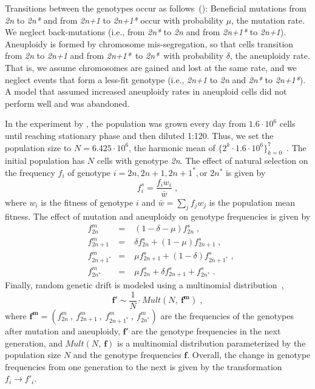 \documentclass[12pt]{extarticle}
\let\vec\mathbf
\newcommand{\euwt}{\emph{2n}}
\newcommand{\anwt}{\emph{2n+1}}
\newcommand{\eumt}{\emph{2n*}}
\newcommand{\anmt}{\emph{2n+1*}}
\begin{document}
Transitions between the genotypes occur as follows~(): Beneficial mutations from \euwt\; to \eumt\; and from \anwt\; to \anmt\; occur with probability $\mu$, the mutation rate. We neglect back-mutations (i.e., from \eumt\; to \euwt\; and from \anmt\; to \anwt).
Aneuploidy is formed by chromosome mis-segregation, so that cells transition from \euwt\; to \anwt\; and from \anmt\ to \eumt\ with probability $\delta$, the aneuploidy rate. That is, we assume chromosomes are gained and lost at the same rate, and we neglect events that form a less-fit genotype (i.e., \anwt\; to \euwt\; and \eumt\; to \anmt). A model that assumed increased aneuploidy rates in aneuploid cells did not perform well and was abandoned.

In the experiment by \citet{Yona2012}, the population was grown every day from $1.6 \cdot 10^6$ cells until reaching stationary phase and then diluted 1:120.
Thus, we set the population size to $N=6.425 \cdot 10^6$, the harmonic mean of $\{2^k \cdot 1.6 \cdot 10^6\}_{k=0}^{7}$~\citep{Crow1970}.
The initial population has $N$ cells with genotype \euwt. 
The effect of natural selection on the frequency $f_i$ of genotype $i = 2n, 2n+1, 2n+1^*, \text{or } 2n^*$ is given by
    \begin{equation} \label{eq:selection-single} 
      f^s_i = \frac{f_i w_i}{\bar{w}} \;,
    \end{equation}
where $w_i$ is the fitness of genotype $i$ and $\bar{w} = \sum_{j}{f_j w_j}$ is the population mean fitness.
The effect of mutation and aneuploidy on genotype frequencies is given by
    \begin{equation} \label{eq:mutation-aneuploidy-single}
    \begin{aligned}
      &f^m_{2n} &=&\; (1 - \delta - \mu) f^s_{2n}  \;,\\
      &f^m_{2n+1} &=&\; \delta f^s_{2n} + (1 - \mu) f^s_{2n+1}  \;,\\
      &f^m_{2n+1^*} &=&\; \mu f^s_{2n+1} + (1-\delta) f^s_{2n+1^*}  \;,\\
      &f^m_{2n^*} &=&\; \mu f^s_{2n} + \delta f^s_{2n+1} + f^s_{2n^*}  \;.
    \end{aligned}
    \end{equation}
Finally, random genetic drift is modeled using a multinomial distribution~\citep{Otto2007},
    \begin{equation} \label{eq:drift-single}
      \vec{f'} \sim \frac{1}{N} \cdot \mathit{Mult}(N,\ \vec{f^m}) \;,
    \end{equation}
where $\vec{f^m}=(f^m_{2n}\ ,\ f^m_{2n+1}\ ,\ f^m_{2n+1^*}\ ,\ f^m_{2n^*})$ are the frequencies of the genotypes after mutation and aneuploidy, $\vec{f'}$ are the genotype frequencies in the next generation, and $Mult(N,\ \vec{f})$ is a multinomial distribution parameterized by the population size $N$ and the genotype frequencies $\vec{f}$.
Overall, the change in genotype frequencies from one generation to the next is given by the transformation $f_i \to f'_i$.
\end{document}
